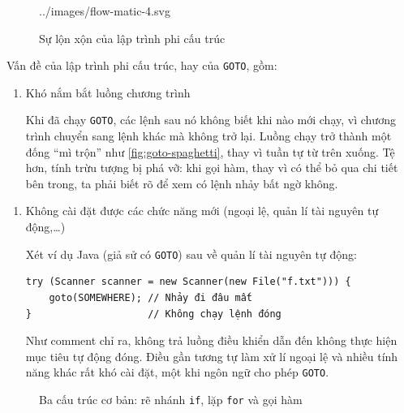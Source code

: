 \documentclass[../../thesis]{subfiles}
\begin{document}
\begin{figure}
    \centering
    
        {../images/flow-matic-4.svg}
    \caption{Sự lộn xộn của lập trình phi cấu trúc \cite{NJS_SC}}
    \label{fig:goto-spaghetti}
\end{figure}

Vấn đề của lập trình phi cấu trúc, hay của \texttt{GOTO}, gồm:

\begin{enumerate}
    \item
        Khó nắm bắt luồng chương trình

        Khi đã chạy \texttt{GOTO}, các lệnh sau nó không biết khi nào mới chạy,
        vì chương trình chuyển sang lệnh khác mà không trở lại. Luồng chạy trở
        thành một đống ``mì trộn'' như \autoref{fig:goto-spaghetti}, thay vì
        tuần tự từ trên xuống. Tệ hơn, tính trừu tượng bị phá vỡ: khi gọi hàm,
        thay vì có thể bỏ qua chi tiết bên trong, ta phải biết rõ để xem có lệnh
        nhảy bất ngờ không.
\end{enumerate}

\begin{enumerate}[resume, before = \vspace*{-\dimexpr\topsep+\partopsep\relax}]
    \item
        Không cài đặt được các chức năng mới (ngoại lệ, quản lí tài nguyên tự
        động,\ldots)

        Xét ví dụ Java (giả sử có \texttt{GOTO}) sau về quản lí tài nguyên tự
        động:

        \begin{verbatim}
try (Scanner scanner = new Scanner(new File("f.txt"))) {
    goto(SOMEWHERE); // Nhảy đi đâu mất
}                    // Không chạy lệnh đóng
        \end{verbatim}

        Như comment chỉ ra, không trả luồng điều khiển dẫn đến không thực hiện
        mục tiêu tự động đóng. Điều gần tương tự làm xử lí ngoại lệ và nhiều
        tính năng khác rất khó cài đặt, một khi ngôn ngữ cho phép \texttt{GOTO}.
\end{enumerate}

\begin{figure}
    \centering
    \vspace*{-7mm}
    
    \vspace*{-10mm}
    \caption{Ba cấu trúc cơ bản: rẽ nhánh \texttt{if}, lặp \texttt{for} và gọi
        hàm \cite{NJS_SC}}
    \label{fig:3-basic-construct}
\end{figure}
\end{document}
